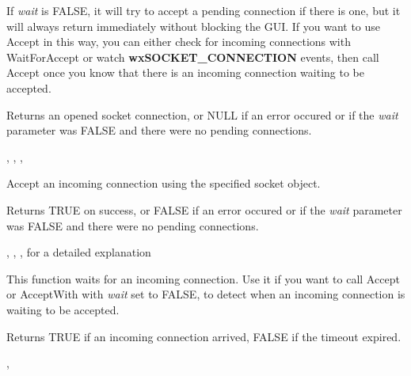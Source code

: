 If {\it wait} is FALSE, it will try to accept a pending connection
if there is one, but it will always return immediately without
blocking the GUI. If you want to use Accept in this way, you can
either check for incoming connections with WaitForAccept or watch
{\bf wxSOCKET\_CONNECTION} events, then call Accept once you know
that there is an incoming connection waiting to be accepted.


Returns an opened socket connection, or NULL if an error occured or
if the {\it wait} parameter was FALSE and there were no pending
connections.


, 
, 
, 

%
%
\label{wxsocketserveracceptwith}


Accept an incoming connection using the specified socket object.




Returns TRUE on success, or FALSE if an error occured or if the
{\it wait} parameter was FALSE and there were no pending
connections.

, 
, 
, 
 for a detailed explanation

%
%
\label{wxsocketserverwaitforaccept}


This function waits for an incoming connection. Use it if you want to call
Accept or AcceptWith with {\it wait} set to FALSE, to detect when an incoming
connection is waiting to be accepted.





Returns TRUE if an incoming connection arrived, FALSE if the timeout expired.


, 

